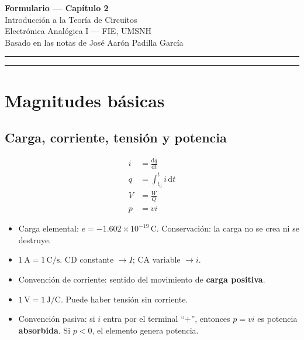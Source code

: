 \documentclass[11pt,a4paper]{article}
\begin{document}
\begin{center}
{\LARGE\bfseries Formulario --- Capítulo 2}\\[0.35em]
{\Large Introducción a la Teoría de Circuitos}\\[0.5em]
{\normalsize Electrónica Analógica I --- FIE, UMSNH}\\[0.2em]
{\small Basado en las notas de José Aarón Padilla García}\\[0.6em]
\rule{0.55\textwidth}{0.6pt}
\end{center}

\tableofcontents
\vspace{0.8em}
\rule{\textwidth}{0.4pt}

\section{Magnitudes básicas}

\subsection{Carga, corriente, tensión y potencia}

\begin{align}
i &= \frac{\mathrm{d}q}{\mathrm{d}t} \tag{2.1}\\
q &= \int_{t_0}^{t} i\,\mathrm{d}t \tag{2.2}\\
V &= \frac{W}{Q} \tag{2.3}\\
p &= vi \tag{2.4}
\end{align}

\begin{itemize}
  \item Carga elemental: \(e = -1.602\times 10^{-19}\,\mathrm{C}\). Conservación: la carga no se crea ni se destruye.
  \item \(1\,\mathrm{A}=1\,\mathrm{C/s}\). CD constante \(\to I\); CA variable \(\to i\).
  \item Convención de corriente: sentido del movimiento de \textbf{carga positiva}.
  \item \(1\,\mathrm{V}=1\,\mathrm{J/C}\). Puede haber tensión sin corriente.
  \item Convención pasiva: si \(i\) entra por el terminal ``\(+\)'', entonces \(p=vi\) es potencia \textbf{absorbida}. Si \(p<0\), el elemento genera potencia.
\end{itemize}

\begin{center}
\end{center}
\end{document}
